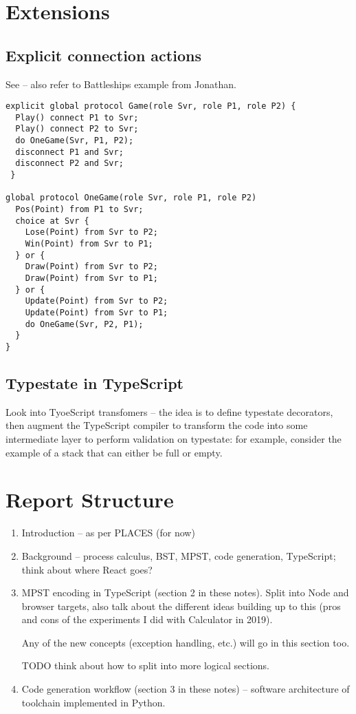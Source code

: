 \documentclass{article}
\begin{document}
\section{Extensions}

\subsection*{Explicit connection actions}

See \cite{FASE2017} -- also refer to Battleships 
example from Jonathan.

\begin{lstlisting}
explicit global protocol Game(role Svr, role P1, role P2) {
  Play() connect P1 to Svr;
  Play() connect P2 to Svr;
  do OneGame(Svr, P1, P2);
  disconnect P1 and Svr;
  disconnect P2 and Svr;
 }

global protocol OneGame(role Svr, role P1, role P2)
  Pos(Point) from P1 to Svr;
  choice at Svr {
    Lose(Point) from Svr to P2;
    Win(Point) from Svr to P1;
  } or {
    Draw(Point) from Svr to P2;
    Draw(Point) from Svr to P1;
  } or {
    Update(Point) from Svr to P2;
    Update(Point) from Svr to P1;
    do OneGame(Svr, P2, P1);
  }
}

\end{lstlisting}

\subsection*{Typestate in TypeScript}

Look into TyoeScript transfomers -- the idea is
to define typestate decorators, then augment the
TypeScript compiler to transform the code into some
intermediate layer to perform validation on
typestate: for example, consider the example of a 
stack that can either be full or empty.

\section{Report Structure}

\begin{enumerate}
\item 
Introduction -- as per PLACES (for now)

\item
Background -- process calculus, BST, MPST, code 
generation, TypeScript; think about where React goes?

\item
MPST encoding in TypeScript (section 2 in these notes).
Split into Node and browser targets, also talk about
the different ideas building up to this (pros and
cons of the experiments I did with Calculator in
2019).

Any of the new concepts (exception handling, etc.) will 
go in this section too.

TODO think about how to split into 
more logical sections.

\item
Code generation workflow (section 3 in these notes)
-- software architecture of
toolchain implemented in Python.

\end{enumerate}

\nocite{*}


\end{document}
